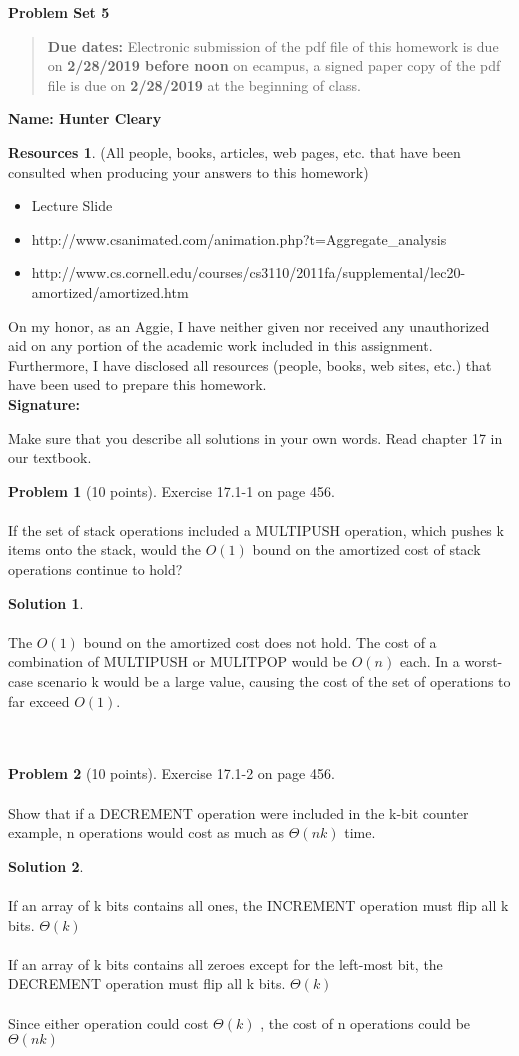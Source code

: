 \documentclass{article}
\theoremstyle{definition}
\newtheorem{problem}{Problem}
\newtheorem*{solution}{Solution}
\newtheorem*{resources}{Resources}
\newcommand{\name}[1]{\noindent\textbf{Name: #1}}
\newcommand{\honor}{\noindent On my honor, as an Aggie, I have neither
  given nor received any unauthorized aid on any portion of the
  academic work included in this assignment. Furthermore, I have
  disclosed all resources (people, books, web sites, etc.) that have
  been used to prepare this homework. \\[1ex]
 \textbf{Signature:} \underline{\hspace*{5cm}} }
\newcommand{\problemset}[1]{\begin{center}\textbf{Problem Set
      #1}\end{center}}
\newcommand{\duedate}[2]{\begin{quote}\textbf{Due dates:} Electronic
    submission of the pdf file of this homework is due on
    \textbf{#1} on ecampus, a signed paper copy of the pdf file is due
    on \textbf{#2} at the beginning of class. \end{quote} }
\begin{document}
\problemset{5}
\duedate{2/28/2019 before noon}{2/28/2019}
\name{ Hunter Cleary }
\begin{resources} (All people, books, articles, web pages, etc. that
  have been consulted when producing your answers to this homework)
    \begin{itemize}
        \item Lecture Slide
        \item http://www.csanimated.com/animation.php?t=Aggregate\_analysis
        \item http://www.cs.cornell.edu/courses/cs3110/2011fa/supplemental/lec20-amortized/amortized.htm
    \end{itemize}
\end{resources}
\honor

\newpage
Make sure that you describe all solutions in your own words. Read
chapter 17 in our textbook. 

\begin{problem}[10 points]
Exercise 17.1-1 on page 456. \\
\\
If the set of stack operations included a MULTIPUSH operation, which pushes k items onto the stack, would the $O(1)$ bound on the amortized cost of stack operations continue to hold?
\end{problem}
\begin{solution} \\
\\
The $O(1)$ bound on the amortized cost does not hold. The cost of a combination of MULTIPUSH or MULITPOP would be $O(n)$ each. In a worst-case scenario k would be a large value, causing the cost of the set of operations to far exceed $O(1)$. \\ \\ \\ 
\end{solution}



\begin{problem}[10 points]
Exercise 17.1-2 on page 456. \\
\\
Show that if a DECREMENT operation were included in the k-bit counter example, n operations would cost as much as $\Theta(nk)$ time.
\end{problem}
\begin{solution} \\
\\
If an array of k bits contains all ones, the INCREMENT operation must flip all k bits. $\Theta(k)$\\
\\
If an array of k bits contains all zeroes except for the left-most bit, the DECREMENT operation must flip all k bits. $\Theta(k)$\\
\\
Since either operation could cost $\Theta(k)$ , the cost of n operations could be $\Theta(nk)$
\\
\end{solution}
\end{document}
